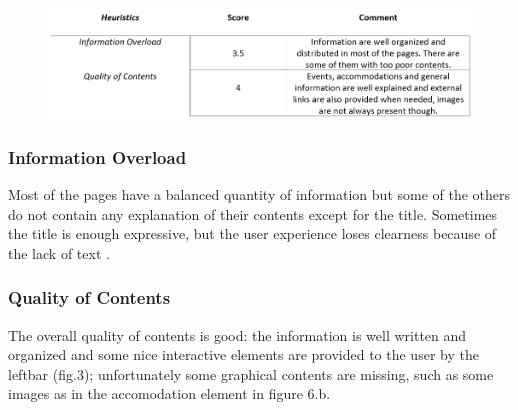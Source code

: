 \begin{figure}[h!]
	\centering
	\begin{minipage}[b]{1\textwidth}
    		\includegraphics[width=\textwidth]{./assets/contents-final.PNG}
	\end{minipage}
\end{figure}
\FloatBarrier

\subsubsection{Information Overload}
Most of the pages have a balanced quantity of information but some of the others do not contain any explanation of their contents except for the title. Sometimes the title is enough expressive, but the user experience loses clearness because of the lack of text .
\FloatBarrier

\subsubsection{Quality of Contents}
The overall quality of contents is good: the information is well written and organized  and some nice interactive elements are provided to the user by the leftbar (fig.3); unfortunately some graphical contents are missing, such as some images as in the accomodation element in figure 6.b.
\begin{figure}[h!]
		\hfill
		\hfill
	\caption{}
\end{figure}




